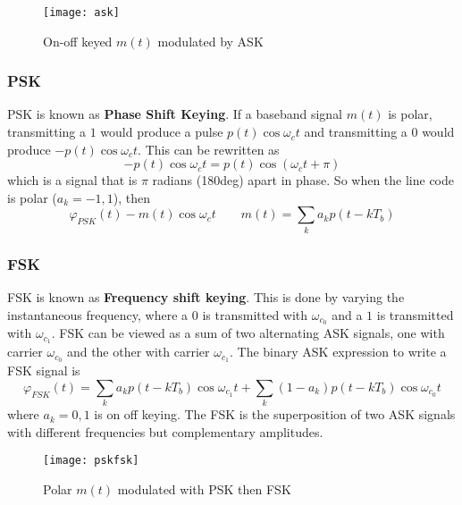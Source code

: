 \documentclass{article}
\begin{document}
    \begin{figure}[h]
        \centering
        \texttt{[image: ask]}
        \caption{On-off keyed $m(t)$ modulated by ASK}
    \end{figure}

    \subsubsection{PSK}
    PSK is known as \textbf{Phase Shift Keying}. If a baseband signal $m(t)$ is polar, transmitting a $1$ 
    would produce a pulse $p(t)\cos \omega_ct$ and transmitting a $0$ would produce $-p(t)\cos \omega_ct$.
    This can be rewritten as 
    \begin{equation}
        -p(t)\cos \omega_ct = p(t)\cos (\omega_ct + \pi)
    \end{equation}
    which is a signal that is $\pi$ radians (180deg) apart in phase.
    So when the line code is polar ($a_k = -1,1$), then
    \begin{equation}
        \varphi_{PSK}(t) - m(t)\cos \omega_c t \quad\quad m(t) = \sum_k a_kp(t-kT_b)
    \end{equation}
     
    \subsubsection{FSK}
    FSK is known as \textbf{Frequency shift keying}. This is done by varying the instantaneous frequency,
    where a $0$ is transmitted with $\omega_{c_0}$ and a $1$ is transmitted with $\omega_{c_1}$. 
    FSK can be viewed as a sum of two alternating ASK signals, one with carrier $\omega_{c_0}$ and the other 
    with carrier $\omega_{c_1}$. The binary ASK expression to write a FSK signal is
    \begin{equation}
        \varphi_{FSK}(t) = \sum_k a_kp(t-kT_b)\cos\omega_{c_1}t + \sum_k(1-a_k)p(t-kT_b)\cos\omega_{c_0}t
    \end{equation}
    where $a_k = 0,1$ is on off keying. The FSK is the superposition of two ASK signals with different 
    frequencies but complementary amplitudes. 

    \begin{figure}[h]
        \centering
        \texttt{[image: pskfsk]}
        \caption{Polar $m(t)$ modulated with PSK then FSK}
    \end{figure}
\end{document}
